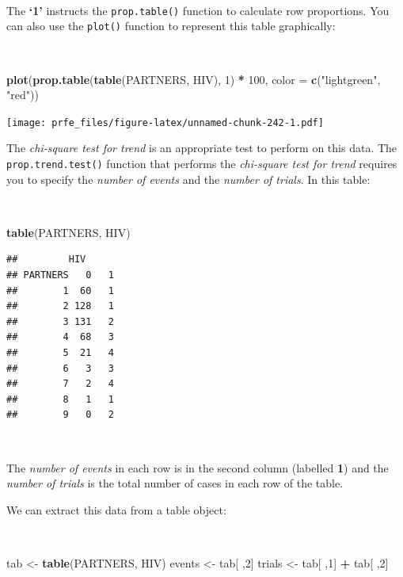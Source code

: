 \documentclass[12pt,a4paper]{book}
\newenvironment{Shaded}{\begin{snugshade}}{\end{snugshade}}
\newcommand{\DataTypeTok}[1]{\textcolor[rgb]{0.13,0.29,0.53}{#1}}
\newcommand{\DecValTok}[1]{\textcolor[rgb]{0.00,0.00,0.81}{#1}}
\newcommand{\KeywordTok}[1]{\textcolor[rgb]{0.13,0.29,0.53}{\textbf{#1}}}
\newcommand{\NormalTok}[1]{#1}
\newcommand{\OperatorTok}[1]{\textcolor[rgb]{0.81,0.36,0.00}{\textbf{#1}}}
\newcommand{\StringTok}[1]{\textcolor[rgb]{0.31,0.60,0.02}{#1}}
\theoremstyle{definition}
\theoremstyle{definition}
\theoremstyle{definition}
\theoremstyle{remark}
\begin{document}
~

The \textbf{`1'} instructs the \texttt{prop.table()} function to
calculate row proportions. You can also use the \texttt{plot()} function
to represent this table graphically:

~

\begin{Shaded}
\begin{Highlighting}[]
\KeywordTok{plot}\NormalTok{(}\KeywordTok{prop.table}\NormalTok{(}\KeywordTok{table}\NormalTok{(PARTNERS, HIV), }\DecValTok{1}\NormalTok{) }\OperatorTok{*}\StringTok{ }\DecValTok{100}\NormalTok{, }\DataTypeTok{color =} \KeywordTok{c}\NormalTok{(}\StringTok{"lightgreen"}\NormalTok{, }\StringTok{"red"}\NormalTok{))}
\end{Highlighting}
\end{Shaded}

\texttt{[image: prfe\_files/figure-latex/unnamed-chunk-242-1.pdf]}

\newpage

The \emph{chi-square test for trend} is an appropriate test to perform
on this data. The \texttt{prop.trend.test()} function that performs the
\emph{chi-square test for trend} requires you to specify the
\emph{number of events} and the \emph{number of trials}. In this table:

~

\begin{Shaded}
\begin{Highlighting}[]
\KeywordTok{table}\NormalTok{(PARTNERS, HIV)}
\end{Highlighting}
\end{Shaded}

\begin{verbatim}
##         HIV
## PARTNERS   0   1
##        1  60   1
##        2 128   1
##        3 131   2
##        4  68   3
##        5  21   4
##        6   3   3
##        7   2   4
##        8   1   1
##        9   0   2
\end{verbatim}

~

The \emph{number of events} in each row is in the second column
(labelled \textbf{1}) and the \emph{number of trials} is the total
number of cases in each row of the table.

We can extract this data from a table object:

~

\begin{Shaded}
\begin{Highlighting}[]
\NormalTok{tab <-}\StringTok{ }\KeywordTok{table}\NormalTok{(PARTNERS, HIV)}
\NormalTok{events <-}\StringTok{ }\NormalTok{tab[ ,}\DecValTok{2}\NormalTok{]}
\NormalTok{trials <-}\StringTok{ }\NormalTok{tab[ ,}\DecValTok{1}\NormalTok{] }\OperatorTok{+}\StringTok{ }\NormalTok{tab[ ,}\DecValTok{2}\NormalTok{]}
\end{Highlighting}
\end{Shaded}
\end{document}
